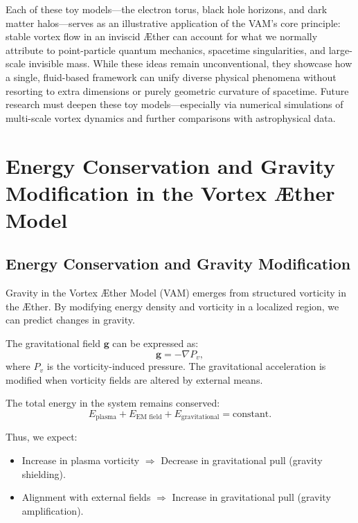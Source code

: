 \documentclass[a4paper,12pt]{article}
\begin{document}
Each of these toy models—the electron torus, black hole horizons, and dark matter halos—serves as an illustrative application of the VAM's core principle: stable vortex flow in an inviscid Æther can account for what we normally attribute to point-particle quantum mechanics, spacetime singularities, and large-scale invisible mass. While these ideas remain unconventional, they showcase how a single, fluid-based framework can unify diverse physical phenomena without resorting to extra dimensions or purely geometric curvature of spacetime. Future research must deepen these toy models—especially via numerical simulations of multi-scale vortex dynamics and further comparisons with astrophysical data.

    
\section{Energy Conservation and Gravity Modification in the Vortex Æther Model}


\subsection{Energy Conservation and Gravity Modification}
Gravity in the Vortex Æther Model (VAM) emerges from structured vorticity in the Æther. By modifying energy density and vorticity in a localized region, we can predict changes in gravity.


The gravitational field $\mathbf{g}$ can be expressed as:
\begin{equation}
\mathbf{g} = -\nabla P_v,
\end{equation}
where $P_v$ is the vorticity-induced pressure. The gravitational acceleration is modified when vorticity fields are altered by external means.


The total energy in the system remains conserved:
\begin{equation}
E_\text{plasma} + E_\text{EM field} + E_\text{gravitational} = \text{constant}.
\end{equation}


Thus, we expect:
\begin{itemize}
\item Increase in plasma vorticity $\Rightarrow$ Decrease in gravitational pull (gravity shielding).
\item Alignment with external fields $\Rightarrow$ Increase in gravitational pull (gravity amplification).
\end{itemize}
\end{document}
